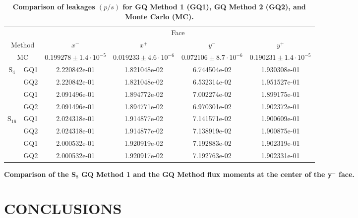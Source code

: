 \documentclass[12pt]{article}
\newcommand{\LTA}[1]{\label{ta:#1}}
\begin{document}
\begin{center}
\begin{table}[!htb]
\centering
\caption{\bf Comparison of leakages $(p/s)$ for GQ Method 1 (GQ1), GQ Method 2 (GQ2), and Monte Carlo (MC).}
\LTA{1}
\vspace{14pt}
\small
\begin{tabular}{crcccc} 
\toprule[1pt]
                          & & \multicolumn{4}{c}{Face} \\ \cline{3-6}
\multicolumn{2}{c}{Method}  &  $x^-$  & $x^+$  & $y^-$  & $y^+$  \\ \hline
\multicolumn{2}{c}{MC}      & $0.199278 \pm 1.4 \cdot 10^{-5}$  
                            & $0.019233 \pm 4.6 \cdot 10^{-6}$  
                            & $0.072106 \pm 8.7 \cdot 10^{-6}$  
                            & $0.190231 \pm 1.4 \cdot 10^{-5}$ \\  \hline
\multirow{3}{*}{S$_{4}$}    
& GQ1 & 2.220842e-01 & 1.821048e-02 & 6.744504e-02 & 1.930308e-01 \\
& GQ2 & 2.220842e-01 & 1.821048e-02 & 6.532314e-02 & 1.951527e-01 \\ 
 \hline
\multirow{3}{*}{S$_{8}$}    
& GQ1 & 2.091496e-01 & 1.894772e-02 & 7.002274e-02 & 1.899175e-01 \\
& GQ2 & 2.091496e-01 & 1.894771e-02 & 6.970301e-02 & 1.902372e-01 \\
 \hline
\multirow{3}{*}{S$_{16}$}  
& GQ1 & 2.024318e-01 & 1.914877e-02 & 7.141571e-02 & 1.900609e-01 \\
& GQ2 & 2.024318e-01 & 1.914877e-02 & 7.138919e-02 & 1.900875e-01 \\
 \hline
\multirow{3}{*}{S$_{32}$}   
& GQ1 & 2.000532e-01 & 1.920919e-02 & 7.192883e-02 & 1.902319e-01 \\
& GQ2 & 2.000532e-01 & 1.920917e-02 & 7.192763e-02 & 1.902331e-01 \\
\bottomrule[1pt]
\end{tabular}
\normalsize
\end{table}


\begin{table}[!htb]
\centering
\caption{\bf Comparison of the S$_8$ GQ Method 1 and the GQ Method flux moments at the center of the y$^{-}$ face.}
\LTA{2}
\vspace{14pt}
\small

\normalsize
\end{table}



\section{CONCLUSIONS} 


\end{center}
\end{document}
